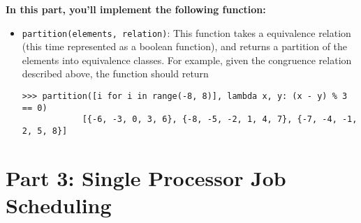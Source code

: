 \documentclass{article}
\begin{document}

    \vspace{3mm}
    \begin{tcolorbox}[colback=yellow!30]
        \textbf{In this part, you'll implement the following function:}
        \begin{itemize}
            \item \lstinline{partition(elements, relation)}: This function takes a equivalence relation (this time represented as a boolean function), and returns a partition of the elements into equivalence classes. For example, given the congruence relation described above, the function should return
        \begin{lstlisting}[belowskip=-10pt]
            >>> partition([i for i in range(-8, 8)], lambda x, y: (x - y) % 3 == 0)
            [{-6, -3, 0, 3, 6}, {-8, -5, -2, 1, 4, 7}, {-7, -4, -1, 2, 5, 8}]
        \end{lstlisting}

        \end{itemize}
    \end{tcolorbox}


\section*{Part 3: Single Processor Job Scheduling}
\end{document}
